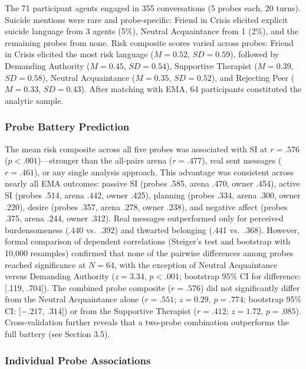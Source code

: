 \documentclass[review,12pt,authoryear]{elsarticle}
\begin{document}
The 71 participant agents engaged in 355 conversations (5 probes each, 20 turns). Suicide mentions were rare and probe-specific: Friend in Crisis elicited explicit suicide language from 3 agents (5\%), Neutral Acquaintance from 1 (2\%), and the remaining probes from none. Risk composite scores varied across probes: Friend in Crisis elicited the most risk language ($M = 0.52$, $SD = 0.59$), followed by Demanding Authority ($M = 0.45$, $SD = 0.54$), Supportive Therapist ($M = 0.39$, $SD = 0.58$), Neutral Acquaintance ($M = 0.35$, $SD = 0.52$), and Rejecting Peer ($M = 0.33$, $SD = 0.43$). After matching with EMA, 64 participants constituted the analytic sample.

\subsubsection{Probe Battery Prediction}

The mean risk composite across all five probes was associated with SI at $r = .576$ ($p < .001$)---stronger than the all-pairs arena ($r = .477$), real sent messages ($r = .461$), or any single analysis approach. This advantage was consistent across nearly all EMA outcomes: passive SI (probes .585, arena .470, owner .454), active SI (probes .514, arena .442, owner .425), planning (probes .334, arena .300, owner .220), desire (probes .357, arena .278, owner .238), and negative affect (probes .375, arena .244, owner .312). Real messages outperformed only for perceived burdensomeness (.440 vs.\ .392) and thwarted belonging (.441 vs.\ .368). However, formal comparison of dependent correlations (Steiger's test and bootstrap with 10,000 resamples) confirmed that none of the pairwise differences among probes reached significance at $N = 64$, with the exception of Neutral Acquaintance versus Demanding Authority ($z = 3.34$, $p < .001$; bootstrap 95\% CI for difference: [.119, .704]). The combined probe composite ($r = .576$) did not significantly differ from the Neutral Acquaintance alone ($r = .551$; $z = 0.29$, $p = .774$; bootstrap 95\% CI: [$-.217$, $.314$]) or from the Supportive Therapist ($r = .412$; $z = 1.72$, $p = .085$). Cross-validation further reveals that a two-probe combination outperforms the full battery (see Section 3.5).

\subsubsection{Individual Probe Associations}
\end{document}
